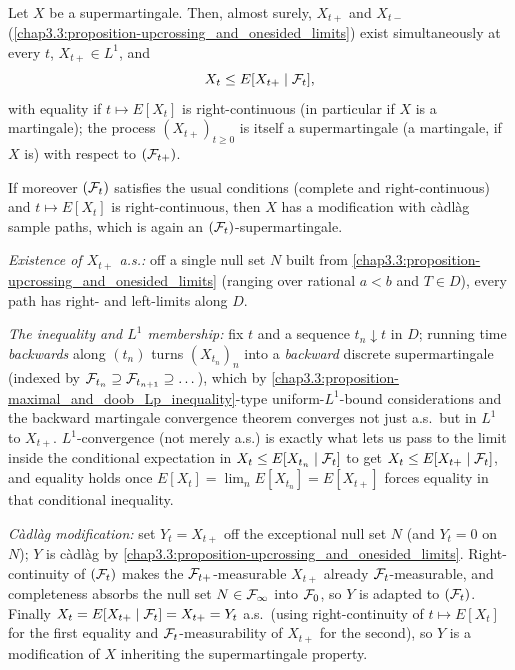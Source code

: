 \begin{theorem} \label{chap3.3:theorem-cadlag_modification}  \\
Let $X$ be a supermartingale. Then, almost surely, $X_{t+}$ and $X_{t-}$ (\cref{chap3.3:proposition-upcrossing_and_onesided_limits}) exist simultaneously at every $t$, $X_{t+}\in L^1$, and
$$X_t\le E[X_{t+}\mid\mathcal{F}_t],$$
with equality if $t\mapsto E[X_t]$ is right-continuous (in particular if $X$ is a martingale); the process $(X_{t+})_{t\ge0}$ is itself a supermartingale (a martingale, if $X$ is) with respect to $(\mathcal{F}_{t+})$.

If moreover $(\mathcal{F}_t)$ satisfies the usual conditions (complete and right-continuous) and $t\mapsto E[X_t]$ is right-continuous, then $X$ has a modification with càdlàg sample paths, which is again an $(\mathcal{F}_t)$-supermartingale.
\end{theorem}
\begin{proofidea}
\textit{Existence of $X_{t+}$ a.s.:} off a single null set $N$ built from \cref{chap3.3:proposition-upcrossing_and_onesided_limits} (ranging over rational $a<b$ and $T\in D$), every path has right- and left-limits along $D$.

\textit{The inequality and $L^1$ membership:} fix $t$ and a sequence $t_n\downarrow t$ in $D$; running time \emph{backwards} along $(t_n)$ turns $(X_{t_n})_n$ into a \textit{backward} discrete supermartingale (indexed by $\mathcal{F}_{t_n}\supseteq\mathcal{F}_{t_{n+1}}\supseteq\dots$), which by \cref{chap3.3:proposition-maximal_and_doob_Lp_inequality}-type uniform-$L^1$-bound considerations and the backward martingale convergence theorem converges not just a.s.\ but in $L^1$ to $X_{t+}$. $L^1$-convergence (not merely a.s.) is exactly what lets us pass to the limit inside the conditional expectation in $X_t\le E[X_{t_n}\mid\mathcal{F}_t]$ to get $X_t\le E[X_{t+}\mid\mathcal{F}_t]$, and equality holds once $E[X_t]=\lim_nE[X_{t_n}]=E[X_{t+}]$ forces equality in that conditional inequality.

\textit{Càdlàg modification:} set $Y_t=X_{t+}$ off the exceptional null set $N$ (and $Y_t=0$ on $N$); $Y$ is càdlàg by \cref{chap3.3:proposition-upcrossing_and_onesided_limits}. Right-continuity of $(\mathcal{F}_t)$ makes the $\mathcal{F}_{t+}$-measurable $X_{t+}$ already $\mathcal{F}_t$-measurable, and completeness absorbs the null set $N\in\mathcal{F}_\infty$ into $\mathcal{F}_0$, so $Y$ is adapted to $(\mathcal{F}_t)$. Finally $X_t=E[X_{t+}\mid\mathcal{F}_t]=X_{t+}=Y_t$ a.s.\ (using right-continuity of $t\mapsto E[X_t]$ for the first equality and $\mathcal{F}_t$-measurability of $X_{t+}$ for the second), so $Y$ is a modification of $X$ inheriting the supermartingale property.
\end{proofidea}
